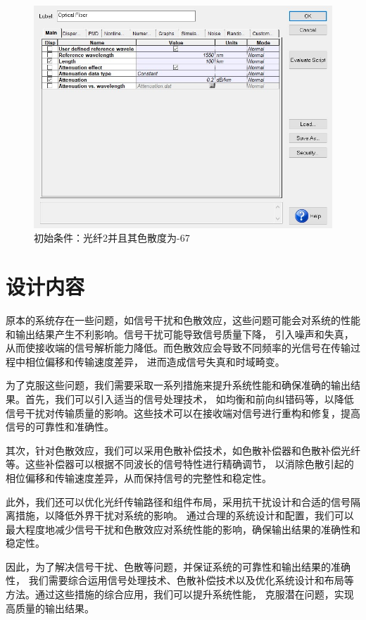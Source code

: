 \documentclass[12pt, a4paper, oneside]{article}
\begin{document}
\begin{spacing}{2.0}
\begin{figure}[H]
  \centering
  \includegraphics[width=13cm]{figure5.png}
  \caption{初始条件：光纤2并且其色散度为-67}
\end{figure}


\clearpage
\section{设计内容}

原本的系统存在一些问题，如信号干扰和色散效应，这些问题可能会对系统的性能和输出结果产生不利影响。信号干扰可能导致信号质量下降，
引入噪声和失真，从而使接收端的信号解析能力降低。而色散效应会导致不同频率的光信号在传输过程中相位偏移和传输速度差异，
进而造成信号失真和时域畸变。

为了克服这些问题，我们需要采取一系列措施来提升系统性能和确保准确的输出结果。首先，我们可以引入适当的信号处理技术，
如均衡和前向纠错码等，以降低信号干扰对传输质量的影响。这些技术可以在接收端对信号进行重构和修复，提高信号的可靠性和准确性。

其次，针对色散效应，我们可以采用色散补偿技术，如色散补偿器和色散补偿光纤等。这些补偿器可以根据不同波长的信号特性进行精确调节，
以消除色散引起的相位偏移和传输速度差异，从而保持信号的完整性和稳定性。

此外，我们还可以优化光纤传输路径和组件布局，采用抗干扰设计和合适的信号隔离措施，以降低外界干扰对系统的影响。
通过合理的系统设计和配置，我们可以最大程度地减少信号干扰和色散效应对系统性能的影响，确保输出结果的准确性和稳定性。

因此，为了解决信号干扰、色散等问题，并保证系统的可靠性和输出结果的准确性，
我们需要综合运用信号处理技术、色散补偿技术以及优化系统设计和布局等方法。通过这些措施的综合应用，我们可以提升系统性能，
克服潜在问题，实现高质量的输出结果。


\end{spacing}
\end{document}
